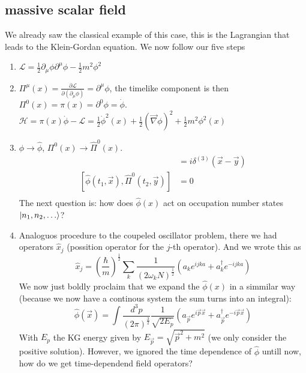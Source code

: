 \documentclass{report}
\begin{document}
\subsection{massive scalar field}
We already saw the classical example of this case, this is the Lagrangian that leads to the Klein-Gordan equation. We now follow our five steps
 \begin{enumerate}
	 \item $\mathcal{L} = \frac{1}{2} \partial_\mu \phi \partial^\mu \phi - \frac{1}{2} m^2 \phi^2  $ 
 \item $\Pi^\mu(x) = \frac{\partial \mathcal{L}}{\partial \left( \partial_\mu \phi   \right)} = \partial^\mu \phi $, the timelike component is then $\Pi^0(x) = \pi(x) = \partial^0 \phi = \dot{\phi} $.\\
		 $\mathcal{H} = \pi(x) \dot{\phi} - \mathcal{L} = \frac{1}{2} \dot{\phi}^2(x) + \frac{1}{2} \left( \vec{\nabla }\phi \right)^2 + \frac{1}{2} m^2 \phi^2(x)$\\
	 \item $\phi \to \hat{\phi }$, $\Pi^0(x) \to \hat{\Pi}^0(x)$.\\
		 \begin{align*}
			 [\hat{\phi }(t, \vec{x}), \hat{\Pi }^0(t, \vec{y})] &= i \delta^{(3)}\left( \vec{x} - \vec{y} \right) \\
			 [\hat{\phi }(t_1, \vec{x}), \hat{\Pi }^0(t_2, \vec{y})] &= 0 \\
		 \end{align*}
		 The next question is: how does $\hat{\phi }(x)$ act on occupation number states $\ket{n_1,n_2,\ldots}$?
	 \item Analoguos procedure to the coupeled oscillator problem, there we had operators $\hat{x}_j$ (possition operator for the $j$-th operator). And we wrote this as \[
			 \hat{x}_j = \left( \frac{\hbar}{m} \right)^{\frac{1}{2}} \sum_{k} \frac{1}{\left( 2 \omega_k N \right)^{\frac{1}{2}}} \left( a_k e^{ijka} + a_k^\dagger e^{-ijka} \right) 
		 \] We now just boldly proclaim that we expand the $\hat{\phi }(x)$ in a simmilar way (because we now have a continous system the sum turns into an integral): \[
		 \hat{\phi}(\vec{x}) = \int \frac{d^3p}{\left( 2 \pi  \right)^{\frac{3}{2}}} \frac{1}{\sqrt{2 E_p} } \left( a_{\vec{p}} e^{i\vec{p}\vec{x}} + a_{\vec{p}}^\dagger e^{-i\vec{p}\vec{x}} \right)
	 \] With $E_p$ the KG energy given by $E_{\vec{p}} = \sqrt{\vec{p}^2 + m^2} $ (we only consider the positive solution). However, we ignored the time dependence of $\hat{\phi }$ untill now, how do we get  time-dependend field operators? \[
\]
\end{enumerate}
\end{document}
